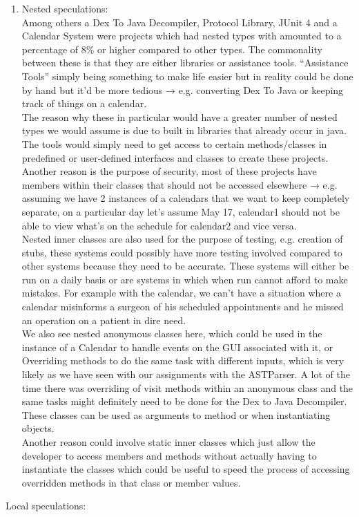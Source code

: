 \documentclass{assignment}
\begin{document}
\begin{enumerate}
\begin{enumerate}
\item Nested speculations:\\
	Among others a Dex To Java Decompiler, Protocol Library, JUnit 4 and a Calendar System were projects which had nested types with amounted to a percentage of 8$\%$ or higher compared to other types. The commonality between these is that they are either libraries or assistance tools. “Assistance Tools” simply being something to make life easier but in reality could be done by hand but it’d be more tedious → e.g. converting Dex To Java or keeping track of things on a calendar. \\
	The reason why these in particular would have a greater number of nested types we would assume is due to built in libraries that already occur in java. The tools would simply need to get access to certain methods/classes in predefined or user-defined interfaces and classes to create these projects.
Another reason is the purpose of security, most of these projects have members within their classes that should not be accessed elsewhere → e.g. assuming we have 2 instances of a calendars that we want to keep completely separate, on a particular day let’s assume May 17, calendar1 should not be able to view what’s on the schedule for calendar2 and vice versa.\\
Nested inner classes are also used for the purpose of testing,  e.g. creation of stubs, these systems could possibly have more testing involved compared to other systems because they need to be accurate. These systems will either be run on a daily basis or are systems in which when run cannot afford to make mistakes. For example with the calendar, we can’t have a situation where a calendar misinforms a surgeon of his scheduled appointments and he missed an operation on a patient in dire need.\\
We also see nested anonymous classes here, which could be used in the instance of a Calendar to handle events on the GUI associated with it, or Overriding methods to do the same task with different inputs, which is very likely as we have seen with our assignments with the ASTParser. A lot of the time there was overriding of visit methods within an anonymous class and the same tasks might definitely need to be done for the Dex to Java Decompiler. These classes can be used as arguments to method or when instantiating objects.\\
Another reason could involve static inner classes which just allow the developer to access members and methods without actually having to instantiate the classes which could be useful to speed the process of accessing overridden methods in that class or member values.
\end{enumerate}
Local speculations:



\end{enumerate}
\end{document}
